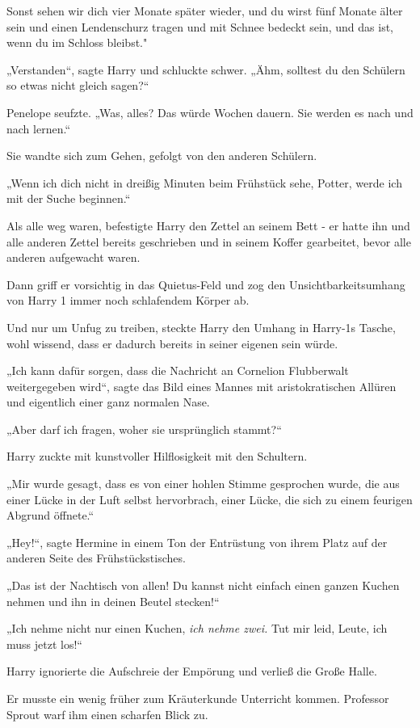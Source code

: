 {Sonst sehen wir dich vier Monate später wieder, und du wirst fünf Monate älter sein und einen Lendenschurz tragen und mit Schnee bedeckt sein, und das ist, wenn du im Schloss bleibst."

„Verstanden“, sagte Harry und schluckte schwer. „Ähm, solltest du den Schülern so etwas nicht gleich sagen?“

Penelope seufzte. „Was, alles? Das würde Wochen dauern. Sie werden es nach und nach lernen.“

Sie wandte sich zum Gehen, gefolgt von den anderen Schülern.

„Wenn ich dich nicht in dreißig Minuten beim Frühstück sehe, Potter, werde ich mit der Suche beginnen.“

Als alle weg waren, befestigte Harry den Zettel an seinem Bett - er hatte ihn und alle anderen Zettel bereits geschrieben und in seinem Koffer gearbeitet, bevor alle anderen aufgewacht waren.

Dann griff er vorsichtig in das Quietus-Feld und zog den Unsichtbarkeitsumhang von Harry 1 immer noch schlafendem Körper ab.

Und nur um Unfug zu treiben, steckte Harry den Umhang in Harry-1s Tasche, wohl wissend, dass er dadurch bereits in seiner eigenen sein würde.

„Ich kann dafür sorgen, dass die Nachricht an Cornelion Flubberwalt weitergegeben wird“, sagte das Bild eines Mannes mit aristokratischen Allüren und eigentlich einer ganz normalen Nase.

„Aber darf ich fragen, woher sie ursprünglich stammt?“

Harry zuckte mit kunstvoller Hilflosigkeit mit den Schultern.

„Mir wurde gesagt, dass es von einer hohlen Stimme gesprochen wurde, die aus einer Lücke in der Luft selbst hervorbrach, einer Lücke, die sich zu einem feurigen Abgrund öffnete.“

„Hey!“, sagte Hermine in einem Ton der Entrüstung von ihrem Platz auf der anderen Seite des Frühstückstisches.

„Das ist der Nachtisch von allen! Du kannst nicht einfach einen ganzen Kuchen nehmen und ihn in deinen Beutel stecken!“

„Ich nehme nicht nur einen Kuchen, \emph{ich nehme zwei.} Tut mir leid, Leute, ich muss jetzt los!“

Harry ignorierte die Aufschreie der Empörung und verließ die Große Halle.

Er musste ein wenig früher zum Kräuterkunde Unterricht kommen. Professor Sprout warf ihm einen scharfen Blick zu.

}

